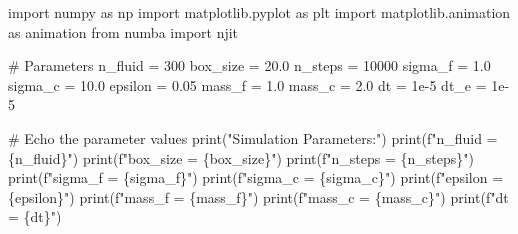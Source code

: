 \documentclass[
  letterpaper,
  enabledeprecatedfontcommands]{report}
\newenvironment{Shaded}{\begin{snugshade}}{\end{snugshade}}
\newcommand{\BuiltInTok}[1]{\textcolor[rgb]{0.00,0.23,0.31}{#1}}
\newcommand{\CommentTok}[1]{\textcolor[rgb]{0.37,0.37,0.37}{#1}}
\newcommand{\DecValTok}[1]{\textcolor[rgb]{0.68,0.00,0.00}{#1}}
\newcommand{\FloatTok}[1]{\textcolor[rgb]{0.68,0.00,0.00}{#1}}
\newcommand{\ImportTok}[1]{\textcolor[rgb]{0.00,0.46,0.62}{#1}}
\newcommand{\NormalTok}[1]{\textcolor[rgb]{0.00,0.23,0.31}{#1}}
\newcommand{\OperatorTok}[1]{\textcolor[rgb]{0.37,0.37,0.37}{#1}}
\newcommand{\SpecialCharTok}[1]{\textcolor[rgb]{0.37,0.37,0.37}{#1}}
\newcommand{\SpecialStringTok}[1]{\textcolor[rgb]{0.13,0.47,0.30}{#1}}
\newcommand{\StringTok}[1]{\textcolor[rgb]{0.13,0.47,0.30}{#1}}
\begin{document}
\begin{Shaded}
\begin{Highlighting}[]
\ImportTok{import}\NormalTok{ numpy }\ImportTok{as}\NormalTok{ np}
\ImportTok{import}\NormalTok{ matplotlib.pyplot }\ImportTok{as}\NormalTok{ plt}
\ImportTok{import}\NormalTok{ matplotlib.animation }\ImportTok{as}\NormalTok{ animation}
\ImportTok{from}\NormalTok{ numba }\ImportTok{import}\NormalTok{ njit}

\CommentTok{\# Parameters}
\NormalTok{n\_fluid }\OperatorTok{=} \DecValTok{300}
\NormalTok{box\_size }\OperatorTok{=} \FloatTok{20.0}
\NormalTok{n\_steps }\OperatorTok{=} \DecValTok{10000}
\NormalTok{sigma\_f }\OperatorTok{=} \FloatTok{1.0}
\NormalTok{sigma\_c }\OperatorTok{=} \FloatTok{10.0}
\NormalTok{epsilon }\OperatorTok{=} \FloatTok{0.05}
\NormalTok{mass\_f }\OperatorTok{=} \FloatTok{1.0}
\NormalTok{mass\_c }\OperatorTok{=} \FloatTok{2.0}
\NormalTok{dt }\OperatorTok{=} \FloatTok{1e{-}5}
\NormalTok{dt\_e }\OperatorTok{=} \FloatTok{1e{-}5}

\CommentTok{\# Echo the parameter values}
\BuiltInTok{print}\NormalTok{(}\StringTok{"Simulation Parameters:"}\NormalTok{)}
\BuiltInTok{print}\NormalTok{(}\SpecialStringTok{f"n\_fluid = }\SpecialCharTok{\{}\NormalTok{n\_fluid}\SpecialCharTok{\}}\SpecialStringTok{"}\NormalTok{)}
\BuiltInTok{print}\NormalTok{(}\SpecialStringTok{f"box\_size = }\SpecialCharTok{\{}\NormalTok{box\_size}\SpecialCharTok{\}}\SpecialStringTok{"}\NormalTok{)}
\BuiltInTok{print}\NormalTok{(}\SpecialStringTok{f"n\_steps = }\SpecialCharTok{\{}\NormalTok{n\_steps}\SpecialCharTok{\}}\SpecialStringTok{"}\NormalTok{)}
\BuiltInTok{print}\NormalTok{(}\SpecialStringTok{f"sigma\_f = }\SpecialCharTok{\{}\NormalTok{sigma\_f}\SpecialCharTok{\}}\SpecialStringTok{"}\NormalTok{)}
\BuiltInTok{print}\NormalTok{(}\SpecialStringTok{f"sigma\_c = }\SpecialCharTok{\{}\NormalTok{sigma\_c}\SpecialCharTok{\}}\SpecialStringTok{"}\NormalTok{)}
\BuiltInTok{print}\NormalTok{(}\SpecialStringTok{f"epsilon = }\SpecialCharTok{\{}\NormalTok{epsilon}\SpecialCharTok{\}}\SpecialStringTok{"}\NormalTok{)}
\BuiltInTok{print}\NormalTok{(}\SpecialStringTok{f"mass\_f = }\SpecialCharTok{\{}\NormalTok{mass\_f}\SpecialCharTok{\}}\SpecialStringTok{"}\NormalTok{)}
\BuiltInTok{print}\NormalTok{(}\SpecialStringTok{f"mass\_c = }\SpecialCharTok{\{}\NormalTok{mass\_c}\SpecialCharTok{\}}\SpecialStringTok{"}\NormalTok{)}
\BuiltInTok{print}\NormalTok{(}\SpecialStringTok{f"dt = }\SpecialCharTok{\{}\NormalTok{dt}\SpecialCharTok{\}}\SpecialStringTok{"}\NormalTok{)}
 

\end{Highlighting}
\end{Shaded}
\end{document}
